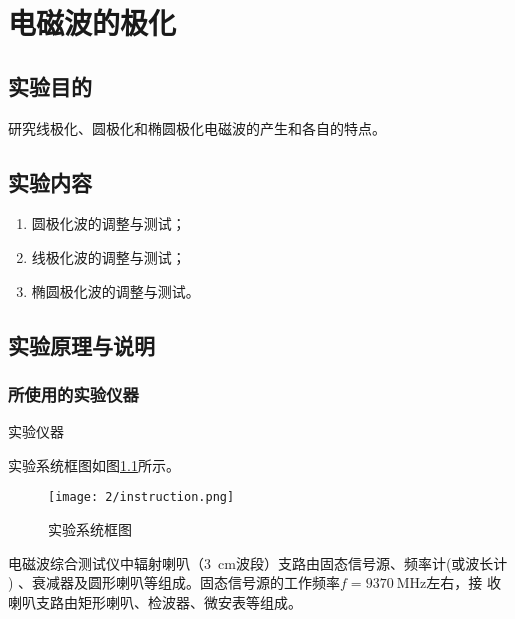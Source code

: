 \documentclass[../main]{subfiles}
\begin{document}
\chapter{电磁波的极化}%
\label{cha:电磁波的极化}

\section{实验目的}%
\label{sec:\arabic{chapter}实验目的}

研究线极化、圆极化和椭圆极化电磁波的产生和各自的特点。

\section{实验内容}%
\label{sec:\arabic{chapter}实验内容}

\begin{enumerate}

	\item 圆极化波的调整与测试；

	\item 线极化波的调整与测试；

	\item 椭圆极化波的调整与测试。

\end{enumerate}

\section{实验原理与说明}%
\label{sec:\arabic{chapter}实验原理与说明}

\subsection{所使用的实验仪器}%
\label{sub:\arabic{chapter}所使用的实验仪器}

\begin{table}[htbp]
	\centering
	\caption{实验仪器}
	\label{tab:\arabic{chapter}实验仪器}
\end{table}

实验系统框图如图\ref{fig:实验系统框图}所示。

\begin{figure}[htbp]
	\centering
	\texttt{[image: 2/instruction.png]}
	\caption{实验系统框图}
	\label{fig:实验系统框图}
\end{figure}

电磁波综合测试仪中辐射喇叭（\SI{3}{\cm}波段）支路由固态信号源、频率计(或波长计
) 、衰减器及圆形喇叭等组成。固态信号源的工作频率$ f = \SI{9370}{\MHz} $左右，接
收喇叭支路由矩形喇叭、检波器、微安表等组成。
\end{document}
